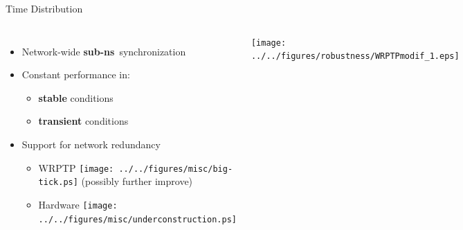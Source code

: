 \documentclass[compress,red]{beamer}
\begin{document}
\begin{frame}{Time Distribution}

  \begin{columns}[c]

  \begin{itemize}
    \item Network-wide {\bf sub-ns}~synchronization
    \vspace{0.3cm}
    \item Constant performance in:
	\begin{itemize}
	  \item {\bf stable} conditions
	  \item {\bf transient} conditions
	\end{itemize}
    \vspace{0.3cm}
    \item Support for network redundancy
    \begin{itemize}
      \item WRPTP \texttt{[image: ../../figures/misc/big-tick.ps]}  (possibly further improve)
      \item Hardware \texttt{[image: ../../figures/misc/underconstruction.ps]}
    \end{itemize}
  \end{itemize}


      \begin{center}
	\texttt{[image: ../../figures/robustness/WRPTPmodif\_1.eps]}
      \end{center}  
    

  \end{columns}

\end{frame}
\end{document}
